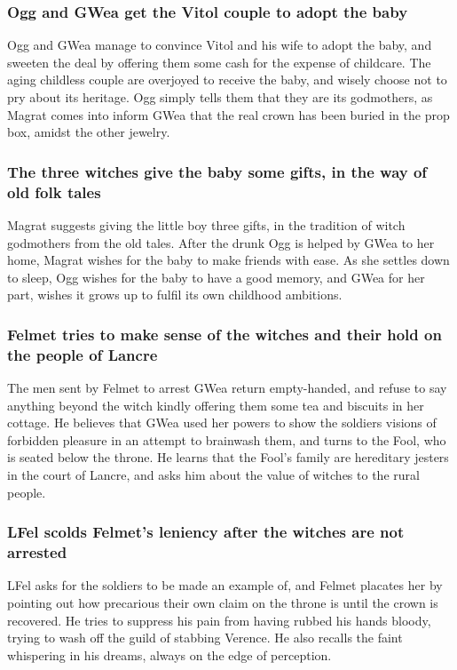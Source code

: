\subsubsection{\Gls{Ogg} and \Gls{GWea} get the \Gls{Vitol} couple to adopt the baby}
\Gls{Ogg} and \Gls{GWea} manage to convince \Gls{Vitol} and his wife to adopt the baby, and sweeten
the deal by offering them some cash for the expense of childcare. The aging childless couple are
overjoyed to receive the baby, and wisely choose not to pry about its heritage. \Gls{Ogg} simply
tells them that they are its godmothers, as \Gls{Magrat} comes into inform \Gls{GWea} that the real
crown has been buried in the prop box, amidst the other jewelry.

\subsubsection{The three witches give the baby some gifts, in the way of old folk tales}
\Gls{Magrat} suggests giving the little boy three gifts, in the tradition of witch godmothers from
the old tales. After the drunk \Gls{Ogg} is helped by \Gls{GWea} to her home, \Gls{Magrat} wishes
for the baby to make friends with ease. As she settles down to sleep, \Gls{Ogg} wishes for the baby
to have a good memory, and \Gls{GWea} for her part, wishes it grows up to fulfil its own childhood
ambitions.

\subsubsection{\Gls{Felmet} tries to make sense of the witches and their hold on the people of
    Lancre}
The men sent by \Gls{Felmet} to arrest \Gls{GWea} return empty-handed, and refuse to say anything
beyond the witch kindly offering them some tea and biscuits in her cottage. He believes that
\Gls{GWea} used her powers to show the soldiers visions of forbidden pleasure in an attempt to
brainwash them, and turns to the \Gls{Fool}, who is seated below the throne. He learns that the
\Gls{Fool}'s family are hereditary jesters in the court of Lancre, and asks him about the value of
witches to the rural people.

\subsubsection{\Gls{LFel} scolds \Gls{Felmet}'s leniency after the witches are not arrested}
\Gls{LFel} asks for the soldiers to be made an example of, and \Gls{Felmet} placates her by
pointing out how precarious their own claim on the throne is until the crown is recovered. He tries
to suppress his pain from having rubbed his hands bloody, trying to wash off the guild of stabbing
\Gls{Verence}. He also recalls the faint whispering in his dreams, always on the edge of perception.

